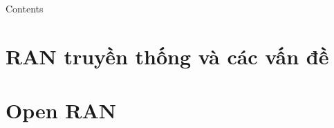\documentclass[aspectratio=169,xcolor=dvipsnames]{beamer}
\begin{document}
\begin{frame}[plain]
  \titlepage
\end{frame}

\begin{frame}[plain]{Contents}
  \tableofcontents
\end{frame}

\section{RAN truyền thống và các vấn đề}


\section{Open RAN}





  
  
  


  
  
\end{document}
